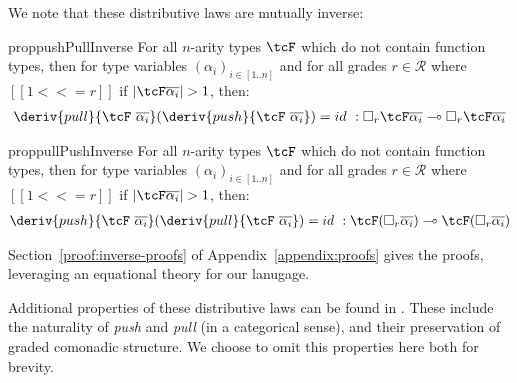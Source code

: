 We note that these distributive laws are mutually inverse:

\begin{restatable}{prop}{pushPullInverse}
  For all $n$-arity types $\tcF$ which do not contain function types,
  then for type variables $(\alpha_i)_{i \in [1..n]}$
  and for all grades $r \in \mathcal{R}$ where $[[1 <<= r]]$ if $|\tcF
    \overline{\alpha_i}| > 1$, then:
  \begin{align*}
\deriv{pull}{\tcF\
  \overline{\alpha_i}}(\deriv{push}{\tcF\
  \overline{\alpha_i}}) = id\ : \Box_{r} \tcF \overline{\alpha_i}
\multimap \Box_{r} \tcF \overline{\alpha_i}
    \end{align*}
\end{restatable}

\begin{restatable}{prop}{pullPushInverse}
  For all $n$-arity types $\tcF$ which do not contain function types,
  then for type variables $(\alpha_i)_{i \in [1..n]}$
  and for all grades $r \in \mathcal{R}$ where $[[1 <<= r]]$ if $|\tcF
    \overline{\alpha_i}| > 1$, then:
  \begin{align*}
\deriv{push}{\tcF\
  \overline{\alpha_i}}(\deriv{pull}{\tcF\
  \overline{\alpha_i}}) = id\ : \tcF (\Box_{r} \overline{\alpha_i})
\multimap \tcF (\Box_{r} \overline{\alpha_i})
    \end{align*}
  \end{restatable}

\noindent
Section~\ref{proof:inverse-proofs} of Appendix~\ref{appendix:proofs} gives the
proofs, leveraging an equational theory for our lanugage.

Additional properties of these distributive laws can be found in
\citet{DBLP:journals/corr/abs-2112-14966}. These include the naturality of
\emph{push} and \emph{pull} (in a categorical sense), and their preservation of
graded comonadic structure. We choose to omit this properties here both for
brevity. 


